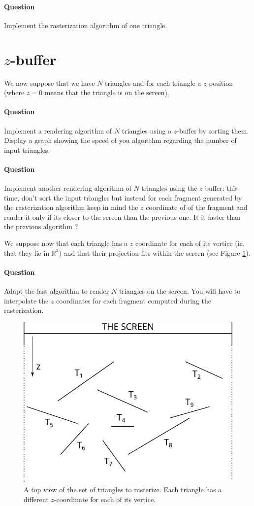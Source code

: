 \documentclass[a4paper, 11pt]{article}
\begin{document}
\paragraph{Question} Implement the rasterization algorithm of one triangle.

\section*{$z$-buffer}

We now suppose that we have $N$ triangles and for each triangle a $z$ position (where $z=0$ means that the triangle is on the screen).

\paragraph{Question} Implement a rendering algorithm of $N$ triangles using a $z$-buffer by sorting them. Display a graph showing the speed of you algorithm regarding the number of input triangles.

\paragraph{Question} Implement another rendering algorithm of $N$ triangles using the $z$-buffer: this time, don't sort the input triangles but instead for each fragment generated by the rasterization algorithm
keep in mind the $z$ coordinate of of the fragment and render it only if its closer to the screen than the previous one. It it faster than the previous algorithm ?

\vspace{5mm}
\noindent We suppose now that each triangle has a $z$ coordinate for each of its vertice (ie. that they lie in $\mathbb{R}^3$) and that their projection fits within the screen (see Figure \ref{fig:zbuffer}).

\paragraph{Question} Adapt the last algorithm to render $N$ triangles on the screen. You will have to interpolate the $z$ coordinates for each fragment computed during the rasterization.

\begin{figure}
  \centering
  \includegraphics[width=\textwidth]{zbuffer}
  \caption{A top view of the set of triangles to rasterize. Each triangle has a different $z$-coordinate for each of its vertice.}
  \label{fig:zbuffer}
\end{figure}
\end{document}
